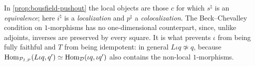 \begin{rmk}
\label{rmk:2dloc-compare-bousfield}
%
In \cref{prop:bousfield-pushout} the local objects are those $c$ for which
$s^{\natural}$ is an \emph{equivalence};
here $i^{\natural}$ is a \emph{localization} and $p^{\natural}$ a
\emph{colocalization}.
The Beck--Chevalley condition on $1$-morphisms has no one-dimensional
counterpart, since, unlike adjoints, inverses are preserved by every square.
It is what prevents $\iota$ from being fully faithful and $T$ from being
idempotent: in general
$L\iota q \not\simeq q$,
because
$\operatorname{Hom}_{\mathcal{P}_{I,P}}(L\iota q,q') \simeq \operatorname{Hom}_{\mathcal{D}}(\iota q,\iota q')$
also contains the non-local $1$-morphisms.
\end{rmk}

